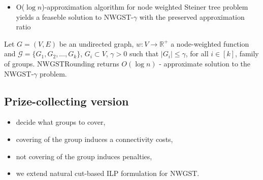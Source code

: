 \documentclass{beamer}
\begin{document}
\begin{frame}{\insertsection}{\insertsubsection}
    \begin{itemize}
        \item O($\log n$)-approximation algorithm for node weighted Steiner tree problem yields a feaseble solution to NWGST-$\gamma$ with the preserved approximation ratio
    \end{itemize}

    \begin{theorem}
        Let $G=\left(V,E\right)$ be an undirected graph, $w:V\rightarrow\mathbb{R}^+$ a node-weighted function and $\mathcal{G}=\{G_1,G_2,\ldots,G_k\}$, $G_i\subset V$, $\gamma>0$ such that $\left|G_i\right|\le\gamma$, for all $i\in\left[k\right]$, family of groups. $\mathrm{NWGSTRounding}$ returns $O\left(\log{n}\right)$ - approximate solution to the NWGST-$\gamma$ problem.
    \end{theorem}
\end{frame}

\subsection*{Prize-collecting version}

\begin{frame}{\insertsection}{\insertsubsection}
    \begin{itemize}[<+->]
        \item decide what groups to cover,
        \item covering of the group induces a connectivity costs,
        \item not covering of the group induces penalties,
        \item we extend natural cut-based ILP formulation for NWGST.
        
    \end{itemize}


\end{frame}
\end{document}
